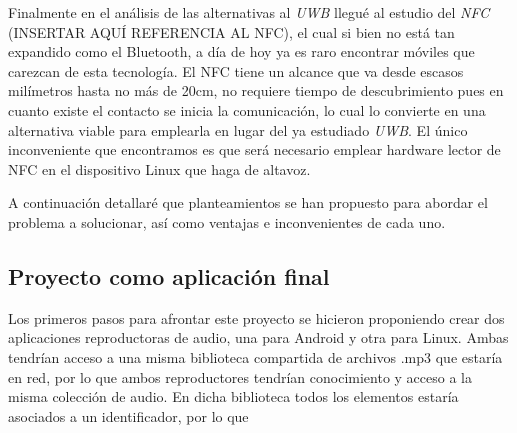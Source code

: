 Finalmente en el análisis de las alternativas al \emph{UWB} llegué al estudio
del \emph{NFC} (INSERTAR AQUÍ REFERENCIA AL NFC), el cual si bien no está tan
expandido como el Bluetooth, a día de hoy ya es raro encontrar móviles que
carezcan de esta tecnología. El NFC tiene un alcance que va desde escasos
milímetros hasta no más de 20cm, no requiere tiempo de descubrimiento pues en
cuanto existe el contacto se inicia la comunicación, lo cual lo convierte en una
alternativa viable para emplearla en lugar del ya estudiado \emph{UWB}. El único
inconveniente que encontramos es que será necesario emplear hardware lector de
NFC en el dispositivo Linux que haga de altavoz.


A continuación detallaré que planteamientos se han propuesto para abordar el
problema a solucionar, así como ventajas e inconvenientes de cada uno.

\subsection{Proyecto como aplicación final}

Los primeros pasos para afrontar este proyecto se hicieron proponiendo crear dos
aplicaciones reproductoras de audio, una para Android y otra para Linux. Ambas
tendrían acceso a una misma biblioteca compartida de archivos .mp3 que estaría
en red, por lo que ambos reproductores tendrían conocimiento y acceso a la misma
colección de audio. En dicha biblioteca todos los elementos estaría asociados a
un identificador, por lo que  